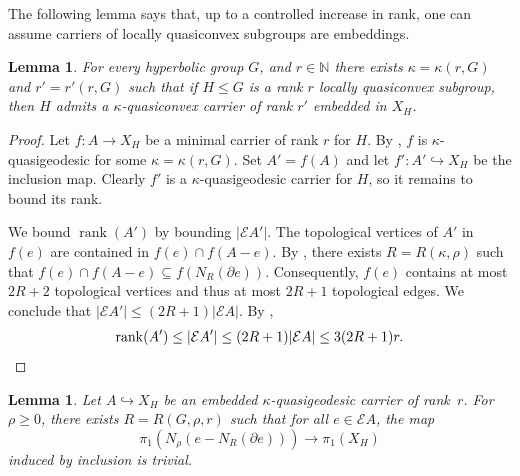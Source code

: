 \documentclass[article, 12pt]{amsart}
\numberwithin{equation}{section}
\newtheorem{lemma}[theorem]{Lemma}
\theoremstyle{definition}
\newcommand{\bbN}{\mathbb{N}}
\newcommand{\calE}{\mathcal{E}}
\DeclareMathOperator{\rank}{rank}
\begin{document}
The following lemma says that, up to a controlled increase in rank, one can assume carriers of locally quasiconvex subgroups are embeddings.

\begin{lemma}
\label{lem:embedded carrier}
    For every hyperbolic group $G$, and $r\in \bbN$ there exists $\kappa=\kappa(r,G)$ and $r'=r'(r,G)$ such that if $H\le G$ is a rank $r$ locally quasiconvex subgroup, then $H$ admits a $\kappa$-quasiconvex carrier of rank $r'$ embedded in $X_H$.
\end{lemma}

\begin{proof}
    Let $f:A\to X_H$ be a minimal carrier of rank $r$ for $H$.
    By , $f$ is $\kappa$-quasigeodesic for some $\kappa = \kappa(r,G)$.
    Set $A'=f(A)$ and let $f':A'\hookrightarrow X_H$ be the inclusion map.
    Clearly $f'$ is a $\kappa$-quasigeodesic carrier for $H$, so it remains to bound its rank.
    
    We bound $\rank(A')$ by bounding $|\calE A'|$. 
    The topological vertices of $A'$ in $f(e)$ are contained in $f(e)\cap f(A-e)$.
    By , there exists $R=R(\kappa,\rho)$ such that $f(e)\cap f(A-e)\subseteq f(N_R(\partial e))$. 
    Consequently, $f(e)$ contains at most $2R+2$ topological vertices and thus at most $2R+1$ topological edges.
    We conclude that $|\calE A'|\le (2R+1)|\calE A|$.
    By , $$\rank(A')\le |\calE A'|\le (2R+1)|\calE A|\le 3(2R+1) r. \qedhere$$
\end{proof}


\begin{lemma}\label{nullhomotopic tubes}
    Let $A\hookrightarrow X_H$ be an embedded $\kappa$-quasigeodesic carrier of rank~$r$. 
    For $\rho\ge 0$, there exists $R=R(G,\rho,r)$ such that for all $e\in \calE A$, the map 
    \[\pi_1(N_\rho(e-N_{R}(\partial e))) \to \pi_1(X_H)\]  induced by inclusion is trivial.
\end{lemma}
\end{document}
